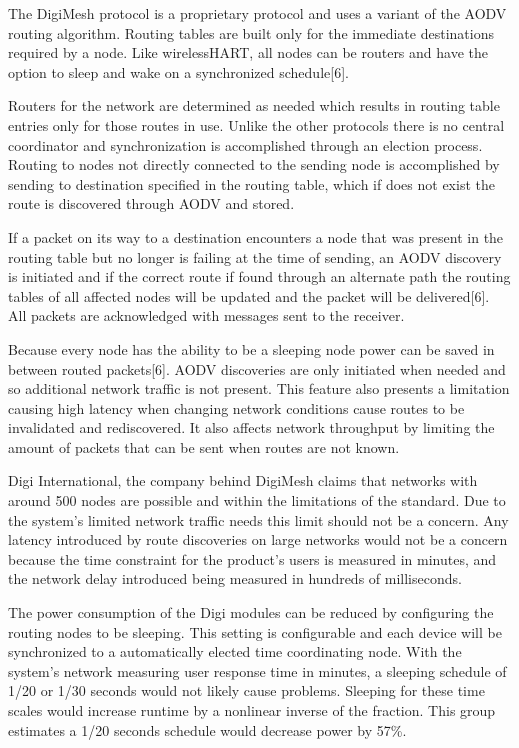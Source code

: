 \documentclass[journal,compsoc]{IEEEtran}
\begin{document}
The DigiMesh protocol is a proprietary protocol and uses a variant of the AODV routing algorithm. Routing tables are built only for the immediate destinations required by a node.  Like wirelessHART, all nodes can be routers and have the option to sleep and wake on a synchronized schedule[6].

Routers for the network are determined as needed which results in routing table entries only for those routes in use. Unlike the other protocols there is no central coordinator and synchronization is accomplished through an election process.  Routing to nodes not directly connected to the sending node is accomplished by sending to destination specified in the routing table, which if does not exist the route is discovered through AODV and stored.

If a packet on its way to a destination encounters a node that was present in the routing table but no longer is failing at the time of sending, an AODV discovery is initiated and if the correct route if found through an alternate path the routing tables of all affected nodes will be updated and the packet will be delivered[6].  All packets are acknowledged with messages sent to the receiver.

Because every node has the ability to be a sleeping node power can be saved in between routed packets[6].  AODV discoveries are only initiated when needed and so additional network traffic is not present.  This feature also presents a limitation causing high latency when changing network conditions cause routes to be invalidated and rediscovered. It also affects network throughput by limiting the amount of packets that can be sent when routes are not known.

Digi International, the company behind DigiMesh claims that networks with around 500 nodes are possible and within the limitations of the standard.  Due to the system's limited network traffic needs this limit should not be a concern.  Any latency introduced by route discoveries on large networks would not be a concern because the time constraint for the product’s users is measured in minutes, and the network delay introduced being measured in hundreds of milliseconds.

The power consumption of the Digi modules can be reduced by configuring the routing nodes to be sleeping.  This setting is configurable and each device will be synchronized to a automatically elected time coordinating node.  With the system's network measuring user response time in minutes, a sleeping schedule of 1/20 or 1/30 seconds would not likely cause problems.  Sleeping for these time scales would increase runtime by a nonlinear inverse of the fraction. This group estimates a 1/20 seconds schedule would decrease power by 57\%.
\end{document}
